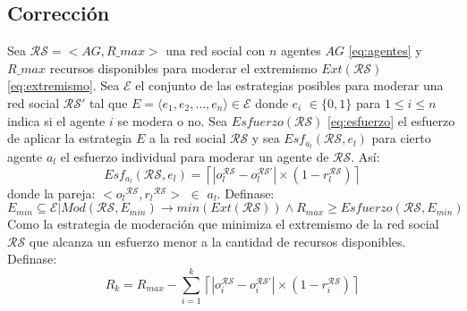 \documentclass[letterpaper,10pt]{article}
\begin{document}
\subsection{Corrección}
\label{subsec:correccion_fuerza_bruta}
Sea \( \mathcal{R}\mathcal{S} = < AG, R\_max > \) una red social con \( n \) agentes $AG$ \eqref{eq:agentes} y \( R\_max \) recursos disponibles para moderar el extremismo $Ext(\mathcal{R}\mathcal{S})$ \eqref{eq:extremismo}.
\newline
Sea \( \mathcal{E} \) el conjunto de las estrategias posibles para moderar una red social \( \mathcal{R}\mathcal{S}' \) tal que \( E = \langle e_1, e_2, \ldots, e_n \rangle \in \mathcal{E}\) donde \( e_i \) $\in \{0,1\} $ para $1\leq i \leq n$ indica si el agente \( i \) se modera o no. 
\newline
Sea $Esfuerzo(\mathcal{R} \mathcal{S})$ \eqref{eq:esfuerzo} el esfuerzo de aplicar la estrategia \( E \) a la red social \( \mathcal{R} \mathcal{S} \) y sea $Esf_{a_l}(\mathcal{R}\mathcal{S},e_l)$ para cierto agente $a_l$ el esfuerzo individual para moderar un agente de $\mathcal{R}\mathcal{S}$. Así:
\begin{equation}
  Esf_{a_l}(\mathcal{R}\mathcal{S},e_l) = \left\lceil |o_l^{\mathcal{R}\mathcal{S}} - o_l^{\mathcal{R}\mathcal{S}'}| \times (1 - r_l^{\mathcal{R}\mathcal{S}}) \right\rceil
\end{equation}
donde la pareja: $<{o_l}{^{\mathcal{R} \mathcal{S}}}, {r_l}{^{\mathcal{R} \mathcal{S}}}>$ $\in$ $a_l$.
\newline
Definase:
\begin{equation}
   E_{min} \subseteq \mathcal{E}  | Mod(\mathcal{R} \mathcal{S}, E_{min}) \rightarrow min(Ext(\mathcal{R} \mathcal{S})) \land R_{max} \geq Esfuerzo(\mathcal{R} \mathcal{S}, E_{min})
\end{equation}
Como la estrategia de moderación que minimiza el extremismo de la red social \( \mathcal{R} \mathcal{S} \) que alcanza un esfuerzo menor a la cantidad de recursos disponibles.
\newline
Definase:
\begin{equation}
  R_{k}=R_{max} -  \sum_{i=1}^{k} \left\lceil  |o_i^{\mathcal{R}\mathcal{S}} - o_i^{\mathcal{R}\mathcal{S}'}| \times (1 - r_i^{\mathcal{R}\mathcal{S}}) \right\rceil
\end{equation}
\end{document}

